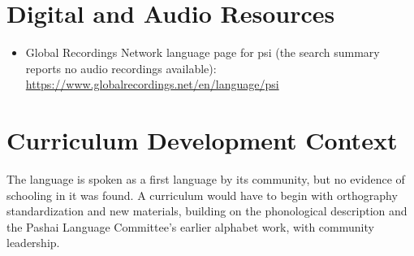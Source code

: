 \documentclass[12pt]{article}
\begin{document}
\section{Digital and Audio Resources}
\begin{itemize}
\item Global Recordings Network language page for psi (the search summary reports no audio recordings available): \url{https://www.globalrecordings.net/en/language/psi}
\end{itemize}

\section{Curriculum Development Context}
The language is spoken as a first language by its community, but no evidence of schooling in it was found. A curriculum would have to begin with orthography standardization and new materials, building on the phonological description and the Pashai Language Committee's earlier alphabet work, with community leadership.
\end{document}
